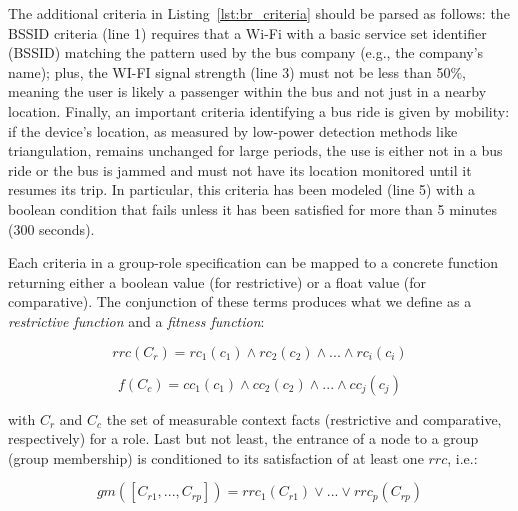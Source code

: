 The additional criteria in Listing~\ref{lst:br_criteria} should be parsed as follows: the BSSID criteria (line 1) requires that a Wi-Fi with a basic service set identifier (BSSID) matching the pattern used by the bus company (e.g., the company's name); plus, the WI-FI signal strength (line 3) must not be less than 50\%, meaning the user is likely a passenger within the bus and not just in a nearby location. Finally, an important criteria identifying a bus ride is given by mobility: if the device's location, as measured by low-power detection methods like triangulation, remains unchanged for large periods, the use is either not in a bus ride or the bus is jammed and must not have its location monitored until it resumes its trip. In particular, this criteria has been modeled (line 5) with a boolean condition that fails unless it has been satisfied for more than 5 minutes (300 seconds).

Each criteria in a group-role specification can be mapped to a concrete function returning either a boolean value (for restrictive) or a float value (for comparative). The conjunction of these terms produces what we define as a \textit{restrictive function} and a \textit{fitness function}:

\begin{equation}\label{eq:rrc}
rrc(C_r) = rc_1(c_1) \wedge rc_2(c_2) \wedge ... \wedge rc_i(c_i)
\end{equation}

\begin{equation}\label{eq:fitness}
f(C_c) = cc_1(c_1) \wedge cc_2(c_2) \wedge ... \wedge cc_j(c_j)
\end{equation}

\noindent
with $C_r$ and $C_c$ the set of measurable context facts (restrictive and comparative, respectively) for a role. Last but not least, the entrance of a node to a group (group membership) is conditioned to its satisfaction of at least one $rrc$, i.e.:

\begin{equation}\label{eq:membership}
gm([C_{r1},...,C_{rp}]) = rrc_1(C_{r1}) \vee ... \vee rrc_p(C_{rp})
\end{equation}

